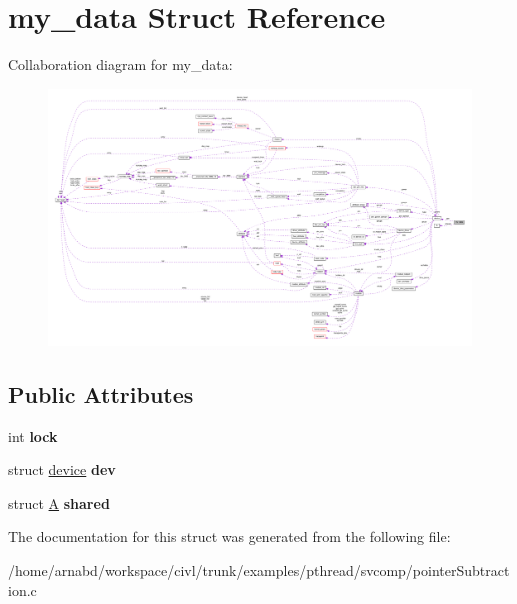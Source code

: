 \hypertarget{structmy__data}{}\section{my\+\_\+data Struct Reference}
\label{structmy__data}


Collaboration diagram for my\+\_\+data\+:
\nopagebreak
\begin{figure}[H]
\begin{center}
\leavevmode
\includegraphics[width=350pt]{structmy__data__coll__graph}
\end{center}
\end{figure}
\subsection*{Public Attributes}
\begin{DoxyCompactItemize}
\item 
\hypertarget{structmy__data_ae33c6c4bb183889e6dc3d47bec851aba}{}int {\bfseries lock}\label{structmy__data_ae33c6c4bb183889e6dc3d47bec851aba}

\item 
\hypertarget{structmy__data_a47ef3cadc05c8450fb950ae063d19f97}{}struct \hyperlink{structdevice}{device} {\bfseries dev}\label{structmy__data_a47ef3cadc05c8450fb950ae063d19f97}

\item 
\hypertarget{structmy__data_a468c07071b59170cc1649a233788b208}{}struct \hyperlink{structA}{A} {\bfseries shared}\label{structmy__data_a468c07071b59170cc1649a233788b208}

\end{DoxyCompactItemize}


The documentation for this struct was generated from the following file\+:\begin{DoxyCompactItemize}
\item 
/home/arnabd/workspace/civl/trunk/examples/pthread/svcomp/pointer\+Subtraction.\+c\end{DoxyCompactItemize}
